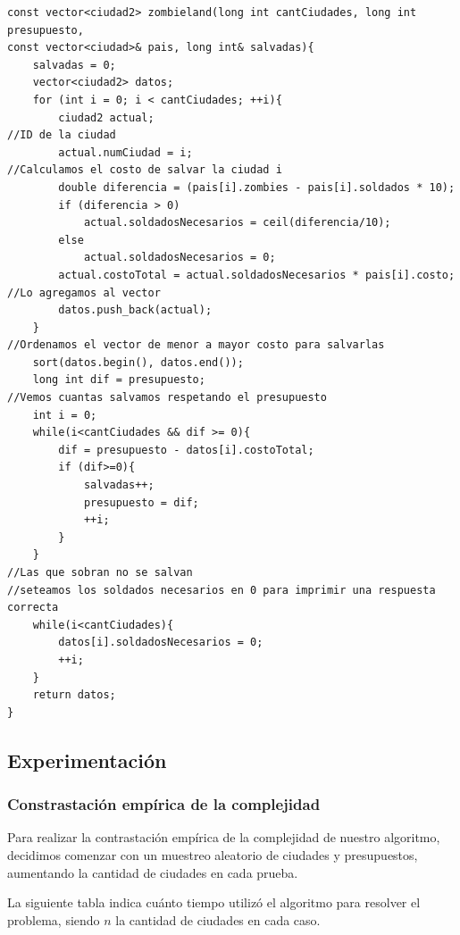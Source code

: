 	
	\begin{codesnippet}
	\begin{verbatim}
const vector<ciudad2> zombieland(long int cantCiudades, long int presupuesto, 
const vector<ciudad>& pais, long int& salvadas){
    salvadas = 0;
    vector<ciudad2> datos;
    for (int i = 0; i < cantCiudades; ++i){
        ciudad2 actual;
//ID de la ciudad
        actual.numCiudad = i;
//Calculamos el costo de salvar la ciudad i
        double diferencia = (pais[i].zombies - pais[i].soldados * 10);
        if (diferencia > 0)
            actual.soldadosNecesarios = ceil(diferencia/10);
        else
            actual.soldadosNecesarios = 0;
        actual.costoTotal = actual.soldadosNecesarios * pais[i].costo;
//Lo agregamos al vector
        datos.push_back(actual);
    }
//Ordenamos el vector de menor a mayor costo para salvarlas
    sort(datos.begin(), datos.end());
    long int dif = presupuesto;
//Vemos cuantas salvamos respetando el presupuesto
    int i = 0;
    while(i<cantCiudades && dif >= 0){
        dif = presupuesto - datos[i].costoTotal;
        if (dif>=0){
            salvadas++;
            presupuesto = dif;
            ++i;
        }
    }
//Las que sobran no se salvan
//seteamos los soldados necesarios en 0 para imprimir una respuesta correcta
    while(i<cantCiudades){
        datos[i].soldadosNecesarios = 0;
        ++i;
    }
    return datos;
}
	\end{verbatim}
	\end{codesnippet}
\newpage
\subsection{Experimentaci\'on}

\subsubsection{Constrastaci\'on emp\'irica de la complejidad}

Para realizar la contrastaci\'on emp\'irica de la complejidad de nuestro algoritmo, decidimos comenzar con un muestreo aleatorio de ciudades y presupuestos, aumentando la cantidad de ciudades en cada prueba.

La siguiente tabla indica cu\'anto tiempo utiliz\'o el algoritmo para resolver el problema, siendo $n$ la cantidad de ciudades en cada caso.

